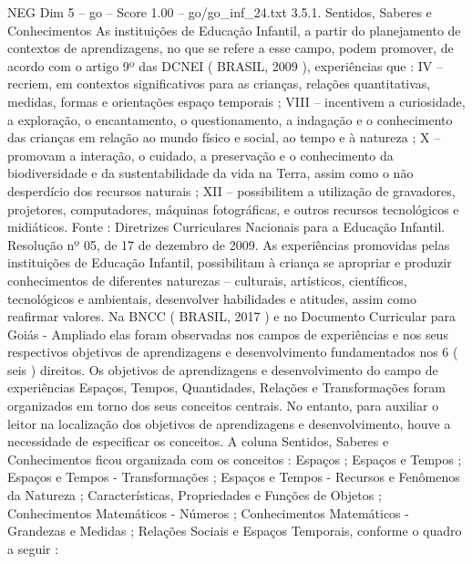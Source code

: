 \begin{textsample}{NEG Dim 5 – go – Score 1.00 – go/go\_inf\_24.txt}  \label{ex:f5_neg_277}
3.5.1.
Sentidos, Saberes e Conhecimentos As instituições de Educação Infantil, a partir do planejamento de contextos de aprendizagens, no que se refere a esse campo, podem promover, de acordo com o artigo 9º das DCNEI ( BRASIL, 2009 ), experiências que : IV – recriem, em contextos significativos para as crianças, relações quantitativas, medidas, formas e orientações espaço temporais ; VIII – incentivem a curiosidade, a exploração, o encantamento, o questionamento, a indagação e o conhecimento das crianças em relação ao mundo físico e social, ao tempo e à natureza ; X – promovam a interação, o cuidado, a preservação e o conhecimento da biodiversidade e da sustentabilidade da vida na Terra, assim como o não desperdício dos recursos naturais ; XII – possibilitem a utilização de gravadores, projetores, computadores, máquinas fotográficas, e outros recursos tecnológicos e midiáticos.
Fonte : Diretrizes Curriculares Nacionais para a Educação Infantil.
Resolução nº 05, de 17 de dezembro de 2009.
As experiências promovidas pelas instituições de Educação Infantil, possibilitam à criança se apropriar e produzir conhecimentos de diferentes naturezas – culturais, artísticos, científicos, tecnológicos e ambientais, desenvolver habilidades e atitudes, assim como reafirmar valores.
Na BNCC ( BRASIL, 2017 ) e no Documento Curricular para Goiás - Ampliado elas foram observadas nos campos de experiências e nos seus respectivos objetivos de aprendizagens e desenvolvimento fundamentados nos 6 ( seis ) direitos.
Os objetivos de aprendizagens e desenvolvimento do campo de experiências Espaços, Tempos, Quantidades, Relações e Transformações foram organizados em torno dos seus conceitos centrais.
No entanto, para auxiliar o leitor na localização dos objetivos de aprendizagens e desenvolvimento, houve a necessidade de especificar os conceitos.
A coluna Sentidos, Saberes e Conhecimentos ficou organizada com os conceitos : Espaços ; Espaços e Tempos ; Espaços e Tempos - Transformações ; Espaços e Tempos - Recursos e Fenômenos da Natureza ; Características, Propriedades e Funções de Objetos ; Conhecimentos Matemáticos - Números ; Conhecimentos Matemáticos - Grandezas e Medidas ; Relações Sociais e Espaços Temporais, conforme o quadro a seguir :

\end{textsample}
